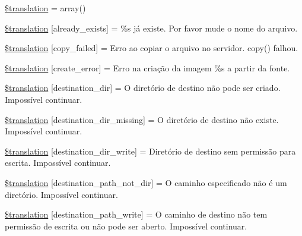 \begin{DoxyCompactItemize}
\item 
\hyperlink{class_8upload_8pt___b_r_8php_a1f198d410fecc3871ebdd468d343a5e3}{\$translation} = array()
\item 
\hyperlink{class_8upload_8pt___b_r_8php_afd84e910217f04139f567c41e292afa5}{\$translation} \mbox{[}\textquotesingle{}already\+\_\+exists\textquotesingle{}\mbox{]} = \textquotesingle{}\%s já existe. Por favor mude o nome do arquivo.\textquotesingle{}
\item 
\hyperlink{class_8upload_8pt___b_r_8php_a783c9358bcf54a054545b50098bc679b}{\$translation} \mbox{[}\textquotesingle{}copy\+\_\+failed\textquotesingle{}\mbox{]} = \textquotesingle{}Erro ao copiar o arquivo no servidor. copy() falhou.\textquotesingle{}
\item 
\hyperlink{class_8upload_8pt___b_r_8php_a53013ce9255c4e1849098ddd9fdb2b3f}{\$translation} \mbox{[}\textquotesingle{}create\+\_\+error\textquotesingle{}\mbox{]} = \textquotesingle{}Erro na criação da imagem \%s a partir da fonte.\textquotesingle{}
\item 
\hyperlink{class_8upload_8pt___b_r_8php_aff2427c72a2598aefa6d58df1dd18b08}{\$translation} \mbox{[}\textquotesingle{}destination\+\_\+dir\textquotesingle{}\mbox{]} = \textquotesingle{}O diretório de destino não pode ser criado. Impossível continuar.\textquotesingle{}
\item 
\hyperlink{class_8upload_8pt___b_r_8php_a9ef28d3cf09942c6c0a1e77fa09185e8}{\$translation} \mbox{[}\textquotesingle{}destination\+\_\+dir\+\_\+missing\textquotesingle{}\mbox{]} = \textquotesingle{}O diretório de destino não existe. Impossível continuar.\textquotesingle{}
\item 
\hyperlink{class_8upload_8pt___b_r_8php_a97608ea194a616db49141a0e6dee900c}{\$translation} \mbox{[}\textquotesingle{}destination\+\_\+dir\+\_\+write\textquotesingle{}\mbox{]} = \textquotesingle{}Diretório de destino sem permissão para escrita. Impossível continuar.\textquotesingle{}
\item 
\hyperlink{class_8upload_8pt___b_r_8php_a5704a67137126e8c87b7a364175929d4}{\$translation} \mbox{[}\textquotesingle{}destination\+\_\+path\+\_\+not\+\_\+dir\textquotesingle{}\mbox{]} = \textquotesingle{}O caminho especificado não é um diretório. Impossível continuar.\textquotesingle{}
\item 
\hyperlink{class_8upload_8pt___b_r_8php_a40e4e1962226b89fd76da5819a9602b0}{\$translation} \mbox{[}\textquotesingle{}destination\+\_\+path\+\_\+write\textquotesingle{}\mbox{]} = \textquotesingle{}O caminho de destino não tem permissão de escrita ou não pode ser aberto. Impossível continuar.\textquotesingle{}

\end{DoxyCompactItemize}
